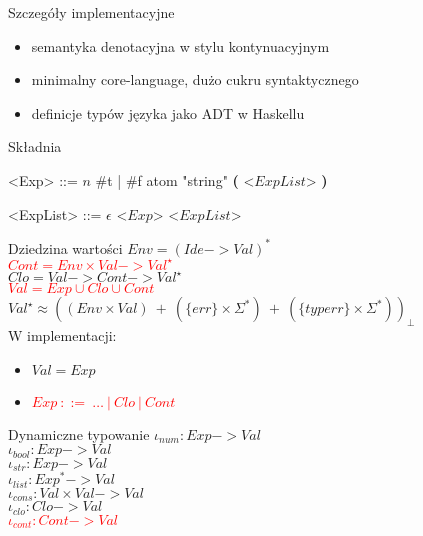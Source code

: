 \documentclass[12pt,serif]{beamer}
\begin{document}
\begin{frame}{Szczegóły implementacyjne}
\begin{itemize}
  \item semantyka denotacyjna w stylu kontynuacyjnym
  \item minimalny core-language, dużo cukru syntaktycznego
  \item definicje typów języka jako ADT w Haskellu
\end{itemize}
\end{frame}

\begin{frame}{Składnia}
\setlength{\grammarindent}{8em}
\begin{grammar}
<Exp> ::= $n$
\alt \#t | \#f
\alt atom
\alt "string"
\alt \textbf{(} <$ExpList$> \textbf{)}

<ExpList> ::= $\epsilon$
\alt <$Exp$> <$ExpList$>
\end{grammar}
\end{frame}

\begin{frame}{Dziedzina wartości}
$Env = (Ide -> Val)^{*}$ \\
\textcolor{red}{$Cont = Env \times Val -> Val^{\star}$} \\
$Clo = Val -> Cont -> Val^{\star}$ \\
\textcolor{red}{$Val = Exp \cup Clo \cup Cont$} \\
$Val^{\star} \approx ((Env \times Val)~+~(\{err\} \times \Sigma^{*})~+~(\{typerr\} \times \Sigma^{*}))_{\bot}$\newline
\\
\pause
W implementacji:
\begin{itemize}
  \item $Val = Exp$
  \item \textcolor{red}{$Exp~::=~\ldots~|~Clo~|~Cont$}
\end{itemize}
\end{frame}


\begin{frame}{Dynamiczne typowanie}
$\iota_{num} : Exp -> Val$ \\
$\iota_{bool} : Exp -> Val$ \\
$\iota_{str} : Exp -> Val$ \\
$\iota_{list} : Exp^{*} -> Val$ \\
$\iota_{cons} : Val \times Val -> Val$ \\
$\iota_{clo} : Clo -> Val$ \\
\textcolor{red}{$\iota_{cont} : Cont -> Val$} \\
\end{frame}
\end{document}
